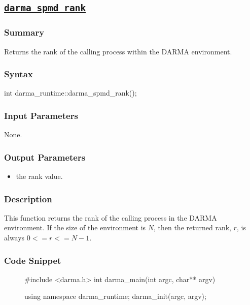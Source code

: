 
\clearpage

\subsection{\underline{\texttt{darma\_spmd\_rank}}}

\hspace{0.1cm} %
\begin{subs}
\vspace{-1.2cm}

\subsubsection{Summary} 
Returns the rank of the calling process within the DARMA environment.

\subsubsection{Syntax} 
\begin{CppCode}
int darma_runtime::darma_spmd_rank();
\end{CppCode}

\subsubsection{Input Parameters} 
None. 

\subsubsection{Output Parameters} 
\begin{itemize}
\item the rank value.
\end{itemize}

\subsubsection{Description} 
This function returns the rank of the calling process 
in the DARMA environment. If the size of the environment is $N$, 
then the returned rank, $r$, is always $0 <= r <= N-1$.

\subsubsection{Code Snippet} 
\begin{figure}[!h]
\begin{CppCodeNumb}
#include <darma.h>
int darma_main(int argc, char** argv)
{
  using namespace darma_runtime;
  darma_init(argc, argv);

}
\end{CppCodeNumb}
\end{figure}
\end{subs}
